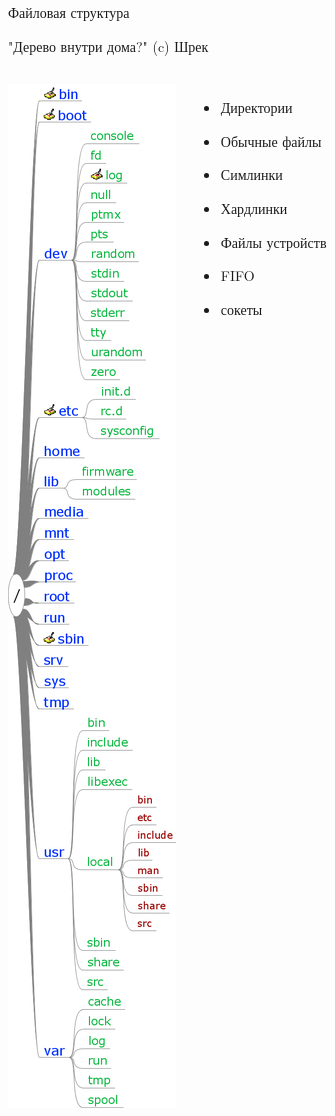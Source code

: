 \begin{frame}{Файловая структура}
	
	{\center "Дерево внутри дома?" (c) Шрек}
		
	\begin{columns}
		\includegraphics[height=0.8\textheight]{../../slides/fs/01-lhs.png}
		\begin{itemize}
			\item Директории
			\item Обычные файлы
			\item Симлинки
			\item Хардлинки
			\item Файлы устройств
			\item FIFO
			\item сокеты
		\end{itemize}
	\end{columns}
\end{frame}
